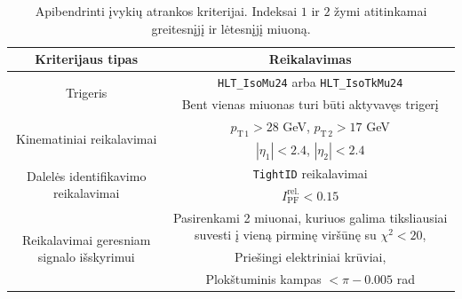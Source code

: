 \documentclass[a4paper, 12pt, oneside]{article}
\newcommand{\ttt}[1]{\texttt{#1}}
\begin{document}
\begin{table}
	\begin{tabular}{|c|c|}
		\hline
		\textbf{Kriterijaus tipas} & \textbf{Reikalavimas} \\
		\hline\hline
		\multirow{3}{12em}{\centering Trigeris} & \ttt{HLT\_IsoMu24} arba \ttt{HLT\_IsoTkMu24} \\ \cline{2-2}
			& \multirow{2}{17em}{\centering Bent vienas miuonas turi būti aktyvavęs trigerį} \\
		 & \\
		\hline\hline
		\multirow{2}{12em}{\centering Kinematiniai reikalavimai} & $p_{\mathrm{T \, 1}} > 28$ GeV, $p_{\mathrm{T \, 2}} > 17$ GeV \\ \cline{2-2}
		 & $|\eta_1| < 2.4$, $|\eta_2| < 2.4$ \\
		\hline\hline
		\multirow{2}{12em}{\centering Dalelės identifikavimo reikalavimai} & \ttt{TightID} reikalavimai \\ \cline{2-2}
		 & $I_{\mathrm{PF}}^{\mathrm{rel.}}<0.15$ \\
		\hline\hline
		\multirow{5}{12em}{\centering Reikalavimai geresniam signalo išskyrimui} &
			\multirow{3}{17em}{\centering Pasirenkami 2 miuonai, kuriuos galima tiksliausiai suvesti į vieną pirminę viršūnę su $\chi^2<20$,} \\
		 & \\
		 & \\ \cline{2-2}
		 & Priešingi elektriniai krūviai, \\ \cline{2-2}
		 & Plokštuminis kampas $< \pi - 0.005$ rad \\
		\hline
	\end{tabular}
	\caption{\label{table:selection}Apibendrinti įvykių atrankos kriterijai. Indeksai $1$ ir $2$ žymi atitinkamai greitesnįjį
	ir lėtesnįjį miuoną.}
\end{table}
\end{document}
